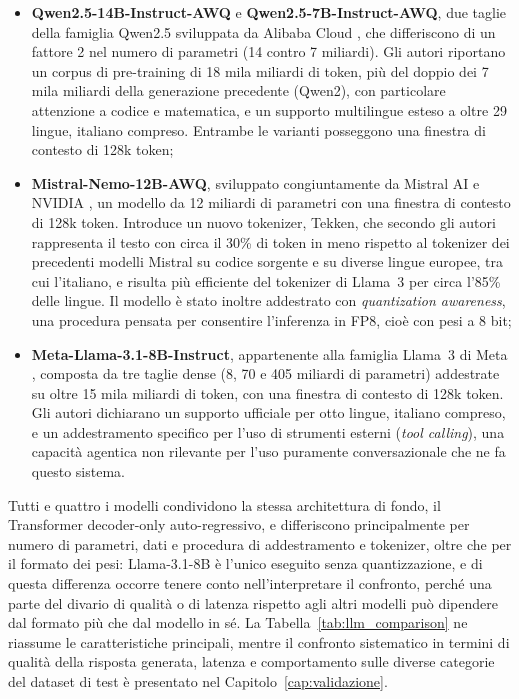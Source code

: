 \begin{itemize}
  \item \textbf{Qwen2.5-14B-Instruct-AWQ} e \textbf{Qwen2.5-7B-Instruct-AWQ}, due taglie della famiglia Qwen2.5
    sviluppata da Alibaba Cloud \cite{qwen2024technical}, che differiscono di un fattore 2 nel numero di parametri
    (14 contro 7 miliardi). Gli autori riportano un corpus di pre-training di 18 mila miliardi di token, più del
    doppio dei 7 mila miliardi della generazione precedente (Qwen2), con particolare attenzione a codice e
    matematica, e un supporto multilingue esteso a oltre 29 lingue, italiano compreso. Entrambe le varianti posseggono una finestra di contesto
    di 128k token;
  \item \textbf{Mistral-Nemo-12B-AWQ}, sviluppato congiuntamente da Mistral AI e NVIDIA
    \cite{mistralai2024nemo}, un modello da 12 miliardi di parametri con una finestra di contesto di 128k token.
    Introduce un nuovo tokenizer, Tekken, che secondo gli autori rappresenta il testo con circa il 30\% di token in
    meno rispetto al tokenizer dei precedenti modelli Mistral su codice sorgente e su diverse lingue europee, tra
    cui l'italiano, e risulta più efficiente del tokenizer di Llama~3 per circa l'85\% delle lingue. Il modello è
    stato inoltre addestrato con \emph{quantization awareness}, una procedura pensata per consentire l'inferenza in
    FP8, cioè con pesi a 8 bit;
  \item \textbf{Meta-Llama-3.1-8B-Instruct}, appartenente alla famiglia Llama~3 di Meta \cite{grattafiori2024llama3},
    composta da tre taglie dense (8, 70 e 405 miliardi di parametri) addestrate su oltre 15 mila miliardi di token,
    con una finestra di contesto di 128k token. Gli autori dichiarano un supporto ufficiale per otto lingue,
    italiano compreso, e un addestramento specifico per l'uso di strumenti esterni (\emph{tool calling}), una
    capacità agentica non rilevante per l'uso puramente conversazionale che ne fa questo sistema.
\end{itemize}

Tutti e quattro i modelli condividono la stessa architettura di fondo, il Transformer decoder-only auto-regressivo, e differiscono principalmente per numero di parametri, dati e
procedura di addestramento e tokenizer, oltre che per il formato dei pesi: Llama-3.1-8B è l'unico eseguito senza
quantizzazione, e di questa differenza occorre tenere conto nell'interpretare il confronto, perché una parte del
divario di qualità o di latenza rispetto agli altri modelli può dipendere dal formato più che dal modello in sé.
La Tabella~\ref{tab:llm_comparison} ne riassume le caratteristiche principali, mentre il confronto sistematico in termini di qualità della risposta generata, latenza e comportamento sulle diverse
categorie del dataset di test è presentato nel Capitolo~\ref{cap:validazione}.

